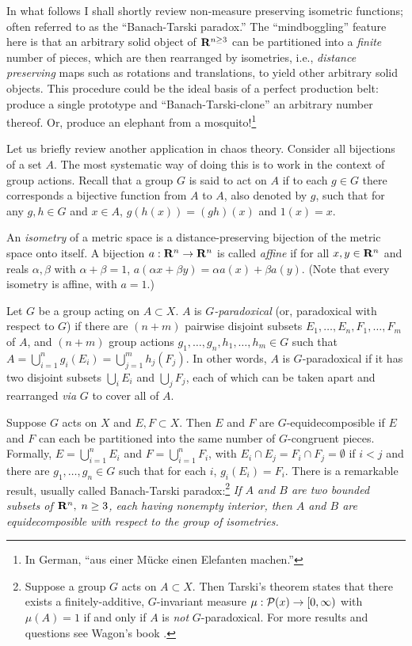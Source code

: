 In what follows I shall shortly review non-measure preserving isometric
functions; often referred to as the ``Banach-Tarski
paradox.''
The ``mindboggling'' feature here is that an arbitrary solid
object of
${\Bbb
R}^{n\ge 3}$ can be partitioned into a {\em finite} number of pieces,
which are then rearranged by isometries, i.e., {\em distance preserving}
maps such as rotations and translations, to yield other arbitrary
solid objects.
This procedure could be the ideal basis of a perfect production belt:
produce a single prototype and ``Banach-Tarski-clone'' an arbitrary
number thereof. Or, produce an elephant from a mosquito!\footnote{
In German, ``aus einer M\"ucke einen Elefanten machen.''}

Let us briefly review another application in chaos theory. Consider all
bijections of a set
$A$.
The most systematic way of doing this is to work in the context of group
actions.
Recall that a group $G$ is said to act on $A$ if to each $g\in G$
there corresponds a bijective function from $A$ to $A$,
also denoted by $g$,
such that for any $g,h\in G$ and $x\in A$, $g(h(x))=(gh)(x)$ and
$1(x)=x$.

An {\em isometry} of a metric space is a distance-preserving bijection
of the metric space onto itself.
 A bijection $a:{\Bbb R}^n\rightarrow {\Bbb R}^n$  is called {\em
affine} if for all
$x,y\in {\Bbb R}^n$ and reals $\alpha ,\beta $ with $\alpha +\beta =1$,
$a(\alpha x+\beta y)=\alpha a(x)+\beta a(y)$.
(Note that every isometry is affine, with $a=1$.)

Let $G$ be a group acting on $A\subset X$.
$A$ is {\em $G$-paradoxical} (or, paradoxical with respect to $G$) if
there are
 $(n+m)$
pairwise disjoint subsets
$E_1,\ldots ,E_n , F_1,\ldots ,F_m $ of $A$, and
 $(n+m)$
group actions $g_1,\ldots ,g_n,h_1,\ldots ,h_m \in G$
such that $A=\bigcup_{i=1}^ng_i(E_i)=\bigcup_{j=1}^mh_j(F_j)$.
In other words, $A$ is $G$-paradoxical if it has two disjoint subsets
$\bigcup_iE_i$ and $\bigcup_jF_j$, each of which can be taken apart and
rearranged {\it via} $G$ to cover all of $A$.

Suppose $G$ acts on $X$ and $E,F\subset X$.
Then $E$ and $F$ are $G$-equidecomposible if $E$ and $F$ can each be
partitioned into the same number of $G$-congruent pieces.
Formally, $E=\bigcup_{i=1}^nE_i$ and $F=\bigcup_{i=1}^nF_i$, with
$E_i\cap E_j=F_i\cap F_j=\emptyset $ if $i<j$
and there are $g_1,\ldots ,g_n\in G$ such that for each $i$,
$g_i(E_i)=F_i$.
There is a remarkable result, usually called Banach-Tarski
paradox:\footnote{
Suppose a group $G$ acts on $A\subset X$.
Then Tarski's theorem  states that there exists a finitely-additive,
$G$-invariant
measure $\mu :{\cal P}(x)\rightarrow [0,\infty )$ with $\mu (A)=1$ if and
only if $A$ is {\em not} $G$-paradoxical.
For more results and questions see Wagon's book \cite{wagon1}.}
 {\em If $A$ and $B$ are two bounded subsets of ${\Bbb R}^n,\;n\ge 3$,
each
having
nonempty interior, then $A$ and $B$ are equidecomposible with respect to
the group of isometries.}

